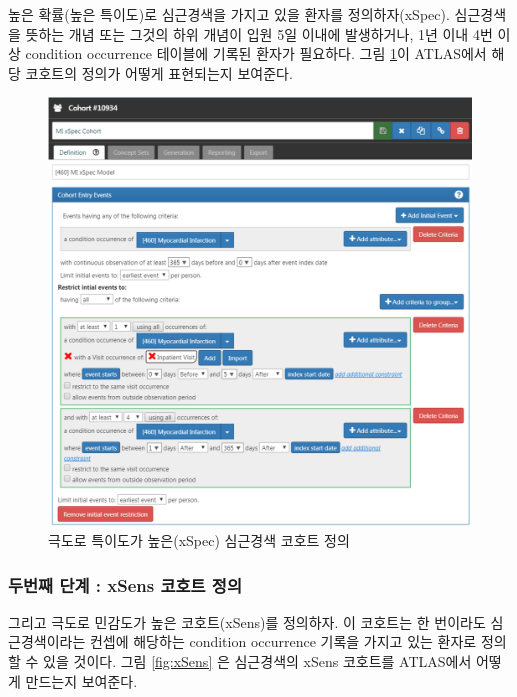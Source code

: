 \documentclass[10.5pt]{book}
\theoremstyle{definition}
\theoremstyle{definition}
\theoremstyle{definition}
\theoremstyle{remark}
\begin{document}
높은 확률(높은 특이도)로 심근경색을 가지고 있을 환자를 정의하자(xSpec).
심근경색을 뜻하는 개념 또는 그것의 하위 개념이 입원 5일 이내에
발생하거나, 1년 이내 4번 이상 condition occurrence 테이블에 기록된
환자가 필요하다. 그림 \ref{fig:xSpec}이 ATLAS에서 해당 코호트의 정의가
어떻게 표현되는지 보여준다. 

\begin{figure}

{\centering \includegraphics[width=1\linewidth]{images/ClinicalValidity/xSpec} 

}

\caption{극도로 특이도가 높은(xSpec) 심근경색 코호트 정의}\label{fig:xSpec}
\end{figure}

\subsubsection*{두번째 단계 : xSens 코호트 정의}\label{--xsens--}

그리고 극도로 민감도가 높은 코호트(xSens)를 정의하자. 이 코호트는 한
번이라도 심근경색이라는 컨셉에 해당하는 condition occurrence 기록을
가지고 있는 환자로 정의할 수 있을 것이다. 그림 \ref{fig:xSens} 은
심근경색의 xSens 코호트를 ATLAS에서 어떻게 만드는지 보여준다.
\end{document}
